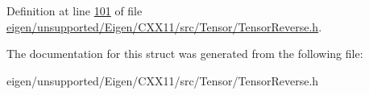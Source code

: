 Definition at line \hyperlink{eigen_2unsupported_2_eigen_2_c_x_x11_2src_2_tensor_2_tensor_reverse_8h_source_l00101}{101} of file \hyperlink{eigen_2unsupported_2_eigen_2_c_x_x11_2src_2_tensor_2_tensor_reverse_8h_source}{eigen/unsupported/\+Eigen/\+C\+X\+X11/src/\+Tensor/\+Tensor\+Reverse.\+h}.



The documentation for this struct was generated from the following file\+:\begin{DoxyCompactItemize}
\item 
eigen/unsupported/\+Eigen/\+C\+X\+X11/src/\+Tensor/\+Tensor\+Reverse.\+h\end{DoxyCompactItemize}
